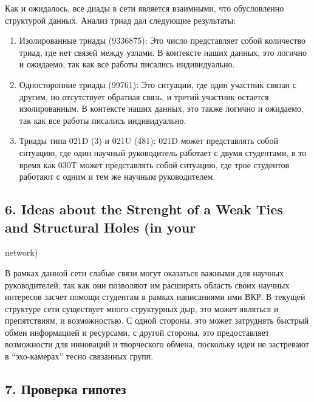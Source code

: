 \documentclass[
]{article}
\begin{document}
Как и ожидалось, все диады в сети является взаимными, что обусловленно
структурой данных. Анализ триад дал следующие результаты:

\begin{enumerate}
\def\labelenumi{\arabic{enumi}.}
\item
  Изолированные триады (9336875): Это число представляет собой
  количество триад, где нет связей между узлами. В контексте наших
  данных, это логично и ожидаемо, так как все работы писались
  индивидуально.
\item
  Односторонние триады (99761): Это ситуации, где один участник связан с
  другим, но отсутствует обратная связь, и третий участник остается
  изолированным. В контексте наших данных, это также логично и ожидаемо,
  так как все работы писались индивидуально.
\item
  Триады типа 021D (3) и 021U (481): 021D может представлять собой
  ситуацию, где один научный руководитель работает с двумя студентами, в
  то время как 030T может представлять собой ситуацию, где трое
  студентов работают с одним и тем же научным руководителем.
\end{enumerate}

\hypertarget{ideas-about-the-strenght-of-a-weak-ties-and-structural-holes-in-your}{%
\subsection{6. Ideas about the Strenght of a Weak Ties and Structural
Holes (in
your}\label{ideas-about-the-strenght-of-a-weak-ties-and-structural-holes-in-your}}

network)

В рамках данной сети слабые связи могут оказаться важными для научных
руководителей, так как они позволяют им расширять область своих научных
интересов засчет помощи студентам в рамках написаниями ими ВКР. В
текущей структуре сети существует много структурных дыр, это может
являться и препятствиям, и возможностью. С одной стороны, это может
затруднять быстрый обмен информацией и ресурсами, с другой стороны, это
предоставляет возможности для инноваций и творческого обмена, поскольку
идеи не застревают в ``эхо-камерах'' тесно связанных групп.

\hypertarget{ux43fux440ux43eux432ux435ux440ux43aux430-ux433ux438ux43fux43eux442ux435ux437}{%
\subsection{7. Проверка
гипотез}\label{ux43fux440ux43eux432ux435ux440ux43aux430-ux433ux438ux43fux43eux442ux435ux437}}
\end{document}
